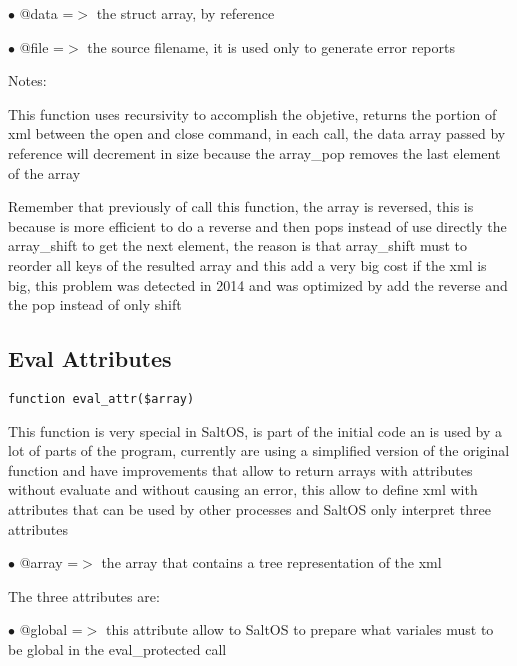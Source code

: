 \documentclass[a4paper]{book}
\begin{document}
\begin{compactitem}
\item[\color{myblue}$\bullet$] @data =$>$ the struct array, by reference
\item[\color{myblue}$\bullet$] @file =$>$ the source filename, it is used only to generate error reports
\end{compactitem}

Notes:

This function uses recursivity to accomplish the objetive, returns the portion
of xml between the open and close command, in each call, the data array passed
by reference will decrement in size because the array\_pop removes the last element
of the array

Remember that previously of call this function, the array is reversed, this is
because is more efficient to do a reverse and then pops instead of use directly
the array\_shift to get the next element, the reason is that array\_shift must to
reorder all keys of the resulted array and this add a very big cost if the xml
is big, this problem was detected in 2014 and was optimized by add the reverse
and the pop instead of only shift

\hypertarget{toc287}{}
\subsection{Eval Attributes}

\begin{lstlisting}
function eval_attr($array)
\end{lstlisting}

This function is very special in SaltOS, is part of the initial code an
is used by a lot of parts of the program, currently are using a simplified
version of the original function and have improvements that allow to return
arrays with attributes without evaluate and without causing an error, this
allow to define xml with attributes that can be used by other processes and
SaltOS only interpret three attributes

\begin{compactitem}
\item[\color{myblue}$\bullet$] @array =$>$ the array that contains a tree representation of the xml
\end{compactitem}

The three attributes are:

\begin{compactitem}
\item[\color{myblue}$\bullet$] @global =$>$ this attribute allow to SaltOS to prepare what variales must to
be global in the eval\_protected call
\end{compactitem}
\end{document}
